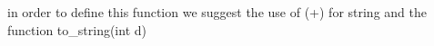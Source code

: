 
\begin{DoxyRefList}
\item[Member \mbox{\hyperlink{classEventSet_afc14a43734b5dc5d03289d02546c9ed9}{Event\+Set::to\+\_\+string}} () const]\label{todo__todo000001}%
%
in order to define this function we suggest the use of (+) for string and the function to\+\_\+string(int d) 
\end{DoxyRefList}